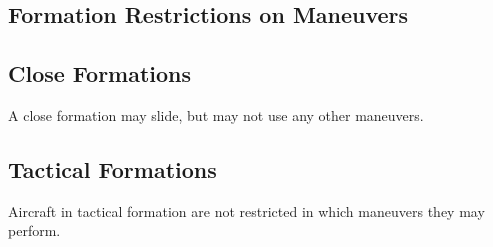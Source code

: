 \begin{advancedrules}
    \section{Formation Restrictions on Maneuvers}

    \subsection{Close Formations} A close formation may slide, but may not use any other maneuvers.

    \subsection{Tactical Formations} Aircraft in tactical formation are not restricted in which maneuvers they may perform.

\end{advancedrules}
